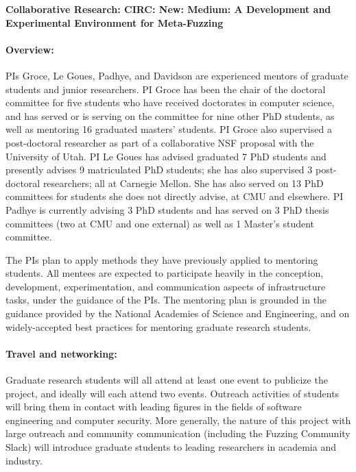 \documentclass[12pt]{article}
\begin{document}

\begin{center}
{\Large\sf\textbf{Collaborative Research: CIRC: New: Medium: A Development and 
Experimental Environment for Meta-Fuzzing}}
\end{center}

\paragraph{Overview:} PIs Groce, Le Goues, Padhye, and Davidson are experienced mentors of graduate students and junior researchers. PI Groce has been the chair of the doctoral committee for five students who have received doctorates in computer science, and has served or is serving on the committee for nine other PhD students, as well as mentoring 16 graduated masters' students. PI Groce also supervised a post-doctoral researcher as part of a collaborative NSF proposal with the University of Utah.  PI Le Goues has advised graduated 7 PhD students and presently advises 9 matriculated PhD students; she has also supervised 3 post-doctoral researchers; all at Carnegie Mellon.  She has also served on 13 PhD committees for students she does not directly advise, at CMU and elsewhere. PI Padhye is currently advising 3 PhD students and has served on 3 PhD thesis committees (two at CMU and one external) as well as 1 Master's student committee.


The PIs plan to apply methods they have previously applied to mentoring students. All mentees are expected to participate heavily in the conception, development, experimentation, and communication aspects of infrastructure tasks, under the guidance of the PIs. The mentoring plan is grounded in the guidance provided by the National Academies of Science
and Engineering, and on widely-accepted best practices for mentoring graduate research students.


\paragraph{Travel and networking:}  Graduate research students will all attend at least one event to  publicize the project, and ideally will each attend two events.  Outreach activities of students will bring them in contact with leading figures in the fields of software engineering and computer security.
More generally, the nature of this project with large outreach and community communication (including the Fuzzing Community Slack) will introduce graduate students to leading researchers in academia and industry.
\end{document}
